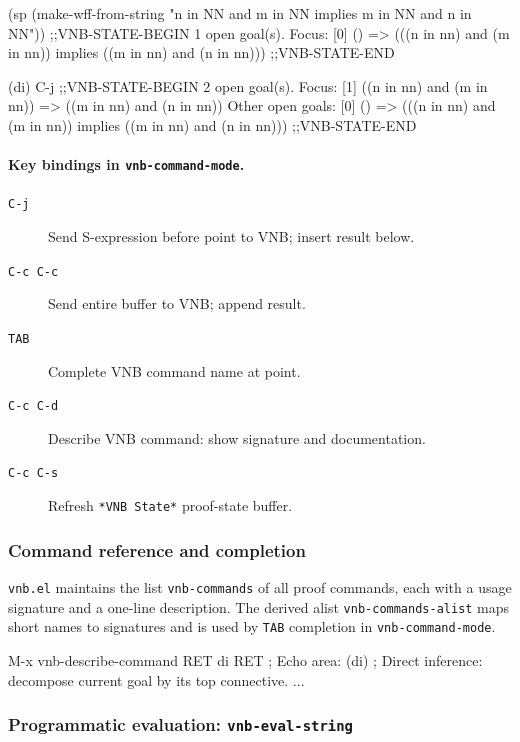 \documentclass{amsbook}[openany]
\theoremstyle{definition}
\theoremstyle{remark}
\theoremstyle{remark}
\begin{document}
\begin{VNBcode}
(sp (make-wff-from-string "n in NN and m in NN implies m in NN and n in NN"))
;;VNB-STATE-BEGIN
1 open goal(s).
Focus:
  [0] ()  =>  (((n in nn) and (m in nn)) implies ((m in nn) and (n in nn)))
;;VNB-STATE-END

(di)       C-j
;;VNB-STATE-BEGIN
2 open goal(s).
Focus:
  [1] ((n in nn) and (m in nn))  =>  ((m in nn) and (n in nn))
Other open goals:
  [0] ()  =>  (((n in nn) and (m in nn)) implies ((m in nn) and (n in nn)))
;;VNB-STATE-END
\end{VNBcode}

\paragraph{Key bindings in \texttt{vnb-command-mode}.}

\begin{description}
\item[\texttt{C-j}] Send S-expression before point to VNB; insert result below.
\item[\texttt{C-c C-c}] Send entire buffer to VNB; append result.
\item[\texttt{TAB}] Complete VNB command name at point.
\item[\texttt{C-c C-d}] Describe VNB command: show signature and documentation.
\item[\texttt{C-c C-s}] Refresh \texttt{*VNB State*} proof-state buffer.
\end{description}

\subsubsection{Command reference and completion}

\texttt{vnb.el} maintains the list \texttt{vnb-commands} of all proof
commands, each with a usage signature and a one-line description.  The
derived alist \texttt{vnb-commands-alist} maps short names to signatures
and is used by \texttt{TAB} completion in \texttt{vnb-command-mode}.

\begin{VNBsnip}
M-x vnb-describe-command   RET   di   RET
; Echo area: (di)
;   Direct inference: decompose current goal by its top connective. ...
\end{VNBsnip}

\subsubsection{Programmatic evaluation: \texttt{vnb-eval-string}}
\end{document}
